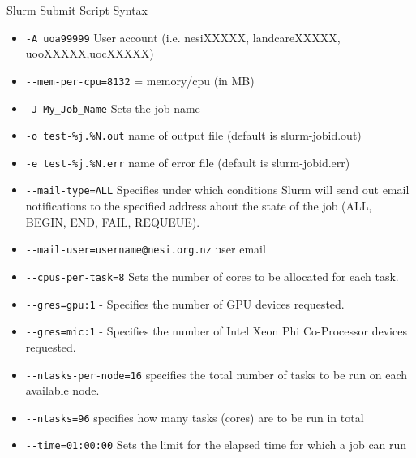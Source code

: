 \documentclass[final,t]{beamer}
\begin{document}
\begin{frame}[fragile]{}
\begin{columns}[t]
\begin{column}{.35\linewidth}
      \begin{block}{Slurm Submit Script Syntax}
        \begin{itemize}
        \item \verb|-A uoa99999| User account (i.e. nesiXXXXX, landcareXXXXX, uooXXXXX,uocXXXXX)
        \item \verb|--mem-per-cpu=8132| = memory/cpu (in MB)
        \item \verb|-J My_Job_Name| Sets the job name
        \item \verb|-o test-%j.%N.out| name of output file (default is slurm-jobid.out)
        \item \verb|-e test-%j.%N.err| name of error file (default is slurm-jobid.err)
        \item \verb|--mail-type=ALL| Specifies under which conditions Slurm will send out email notifications to the specified address about the state of the job (ALL, BEGIN, END, FAIL, REQUEUE).
        \item \verb|--mail-user=username@nesi.org.nz| user email
        \item \verb|--cpus-per-task=8| Sets the number of cores to be allocated for each task.
        \item \verb|--gres=gpu:1| - Specifies the number of GPU devices requested.
        \item \verb|--gres=mic:1| - Specifies the number of Intel Xeon Phi Co-Processor devices requested.
        \item \verb|--ntasks-per-node=16| specifies the total number of tasks to be run on each available node.
        \item \verb|--ntasks=96| specifies how many tasks (cores) are to be run in total
        \item \verb|--time=01:00:00| Sets the limit for the elapsed time for which a job can run

\end{itemize}
\end{block}
\end{column}
\end{columns}
\end{frame}
\end{document}
